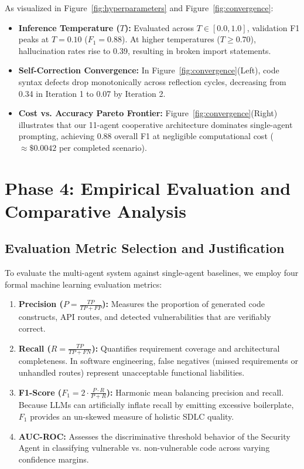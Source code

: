 \documentclass[10pt,journal,compsoc]{IEEEtran}
\begin{document}
As visualized in Figure~\ref{fig:hyperparameters} and Figure~\ref{fig:convergence}:
\begin{itemize}
    \item \textbf{Inference Temperature ($T$):} Evaluated across $T \in [0.0, 1.0]$, validation F1 peaks at $T=0.10$ ($F_1 = 0.88$). At higher temperatures ($T \ge 0.70$), hallucination rates rise to 0.39, resulting in broken import statements.
    \item \textbf{Self-Correction Convergence:} In Figure~\ref{fig:convergence}(Left), code syntax defects drop monotonically across reflection cycles, decreasing from 0.34 in Iteration 1 to 0.07 by Iteration 2.
    \item \textbf{Cost vs. Accuracy Pareto Frontier:} Figure~\ref{fig:convergence}(Right) illustrates that our 11-agent cooperative architecture dominates single-agent prompting, achieving 0.88 overall F1 at negligible computational cost ($\approx \$0.0042$ per completed scenario).
\end{itemize}

\section{Phase 4: Empirical Evaluation and Comparative Analysis}

\subsection{Evaluation Metric Selection and Justification}
To evaluate the multi-agent system against single-agent baselines, we employ four formal machine learning evaluation metrics:
\begin{enumerate}
    \item \textbf{Precision ($P = \frac{TP}{TP + FP}$):} Measures the proportion of generated code constructs, API routes, and detected vulnerabilities that are verifiably correct.
    \item \textbf{Recall ($R = \frac{TP}{TP + FN}$):} Quantifies requirement coverage and architectural completeness. In software engineering, false negatives (missed requirements or unhandled routes) represent unacceptable functional liabilities.
    \item \textbf{F1-Score ($F_1 = 2 \cdot \frac{P \cdot R}{P + R}$):} Harmonic mean balancing precision and recall. Because LLMs can artificially inflate recall by emitting excessive boilerplate, $F_1$ provides an un-skewed measure of holistic SDLC quality.
    \item \textbf{AUC-ROC:} Assesses the discriminative threshold behavior of the Security Agent in classifying vulnerable vs. non-vulnerable code across varying confidence margins.
\end{enumerate}
\end{document}
